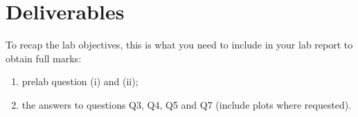 \begin{enumerate}
\end{enumerate}

\newpage
\section{Deliverables}
To recap the lab objectives, this is what you need to include in your lab report to obtain full marks:
\begin{enumerate}
    \item prelab question (i) and (ii);
    \item the answers to questions Q3, Q4, Q5 and Q7 (include plots where requested).
\end{enumerate}
